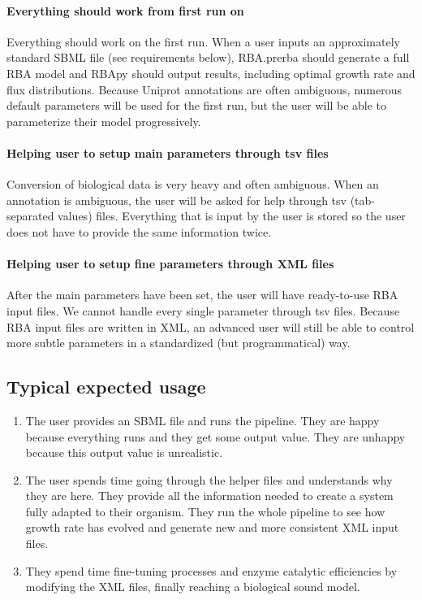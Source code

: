 \documentclass[12pt]{scrartcl}
\theoremstyle{definition}
\theoremstyle{remark}
\numberwithin{equation}{section}
\begin{document}
\paragraph{Everything should work from first run on}
Everything should work on the first run.
When a user inputs an approximately standard SBML file (see requirements below),
RBA.prerba should generate a full RBA model and RBApy should output results, including optimal growth rate and flux distributions.
Because Uniprot annotations are often ambiguous,
numerous default parameters will be used for the first run,
but the user will be able to parameterize their model progressively.

\paragraph{Helping user to setup main parameters through tsv files}
Conversion of biological data is very heavy and often ambiguous.
When an annotation is ambiguous, the user will be asked for help through tsv (tab-separated values) files.
Everything that is input by the user is stored so the user does not have to provide the same information twice.

\paragraph{Helping user to setup fine parameters through XML files}
After the main parameters have been set, the user will have ready-to-use RBA input files.
We cannot handle every single parameter through tsv files.
Because RBA input files are written in XML,
an advanced user will still be able to control more subtle parameters in a standardized (but programmatical) way.

\subsection{Typical expected usage}
\begin{enumerate}
\item The user provides an SBML file and runs the pipeline.
They are happy because everything runs and they get some output value.
They are unhappy because this output value is unrealistic.
\item The user spends time going through the helper files and understands why they are here.
They provide all the information needed to create a system fully adapted to their organism.
They run the whole pipeline to see how growth rate has evolved and generate new and more consistent XML input files.
\item They spend time fine-tuning processes and enzyme catalytic efficiencies
by modifying the XML files, finally reaching a biological sound model.
\end{enumerate}
\end{document}
